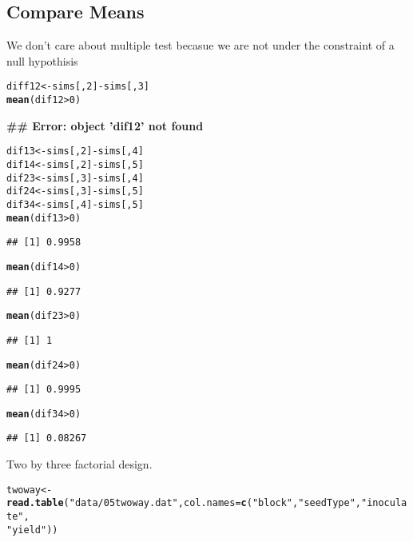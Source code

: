 \documentclass[12pt,letterpaper,oneside]{article}\usepackage{graphicx, color}
\makeatletter
\newcommand{\hlfunctioncall}[1]{\textcolor[rgb]{0.501960784313725,0,0.329411764705882}{\textbf{#1}}}%
\newcommand{\hlstring}[1]{\textcolor[rgb]{0.6,0.6,1}{#1}}%
\newenvironment{kframe}{%
 \def\at@end@of@kframe{}%
 \ifinner\ifhmode%
  \def\at@end@of@kframe{\end{minipage}}%
  \begin{minipage}{\columnwidth}%
 \fi\fi%
 \def\FrameCommand##1{\hskip\@totalleftmargin \hskip-\fboxsep
 \colorbox{shadecolor}{##1}\hskip-\fboxsep
     \hskip-\linewidth \hskip-\@totalleftmargin \hskip\columnwidth}%
 \MakeFramed {\advance\hsize-\width
   \@totalleftmargin\z@ \linewidth\hsize
   \@setminipage}}%
 {\par\unskip\endMakeFramed%
 \at@end@of@kframe}
\newenvironment{knitrout}{}{} %
\makeatother
\begin{document}
\subsection{Compare Means} %
\label{sub:compare_means}
We don't care about multiple test becasue we are not under the constraint of a null hypothisis
\begin{knitrout}\scriptsize
{}\color{fgcolor}\begin{kframe}
\begin{alltt}
diff12 <- sims[, 2] - sims[, 3]
\hlfunctioncall{mean}(dif12 > 0)
\end{alltt}


{\ttfamily\noindent\bfseries\textcolor{errorcolor}{\#\# Error: object 'dif12' not found}}\begin{alltt}
dif13 <- sims[, 2] - sims[, 4]
dif14 <- sims[, 2] - sims[, 5]
dif23 <- sims[, 3] - sims[, 4]
dif24 <- sims[, 3] - sims[, 5]
dif34 <- sims[, 4] - sims[, 5]
\hlfunctioncall{mean}(dif13 > 0)
\end{alltt}
\begin{verbatim}
## [1] 0.9958
\end{verbatim}
\begin{alltt}
\hlfunctioncall{mean}(dif14 > 0)
\end{alltt}
\begin{verbatim}
## [1] 0.9277
\end{verbatim}
\begin{alltt}
\hlfunctioncall{mean}(dif23 > 0)
\end{alltt}
\begin{verbatim}
## [1] 1
\end{verbatim}
\begin{alltt}
\hlfunctioncall{mean}(dif24 > 0)
\end{alltt}
\begin{verbatim}
## [1] 0.9995
\end{verbatim}
\begin{alltt}
\hlfunctioncall{mean}(dif34 > 0)
\end{alltt}
\begin{verbatim}
## [1] 0.08267
\end{verbatim}
\end{kframe}
\end{knitrout}


Two by three factorial design.
\begin{knitrout}\scriptsize
{}\color{fgcolor}\begin{kframe}
\begin{alltt}
twoway <- \hlfunctioncall{read.table}(\hlstring{"data/05twoway.dat"}, col.names = \hlfunctioncall{c}(\hlstring{"block"}, \hlstring{"seedType"}, \hlstring{"inoculate"}, 
    \hlstring{"yield"}))
\end{alltt}
\end{kframe}
\end{knitrout}
\end{document}
